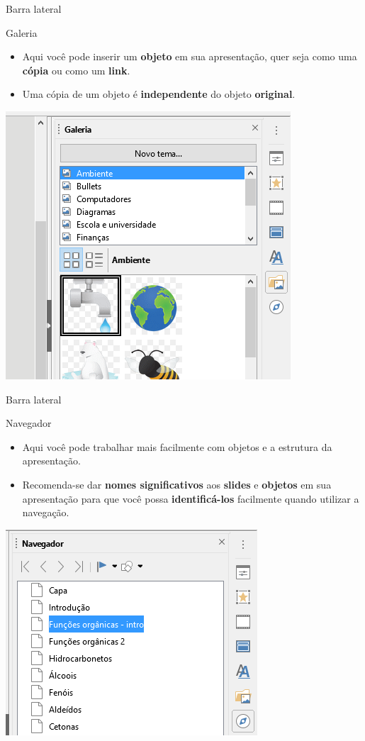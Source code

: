 \begin{frame}{Barra lateral}
	\begin{block}{Galeria}
		\begin{itemize}
			\item Aqui você pode inserir um \textbf{objeto} em sua apresentação, quer seja como uma \textbf{cópia} ou como um \textbf{link}.
			\item Uma cópia de um objeto é \textbf{independente} do objeto \textbf{original}.
		\end{itemize}
	\end{block}

	\centering
	\includegraphics[width=0.45\linewidth]{Figuras/Ch05/fig14}
\end{frame}


\begin{frame}{Barra lateral}
	\begin{block}{Navegador}
		\begin{itemize}
			\item Aqui você pode trabalhar mais facilmente com objetos e a estrutura da apresentação.
			\item Recomenda-se dar \textbf{nomes significativos} aos \textbf{slides} e \textbf{objetos} em sua apresentação para que você possa \textbf{identificá-los} facilmente quando utilizar a navegação.
		\end{itemize}
	\end{block}

	\centering
	\includegraphics[width=0.4\linewidth]{Figuras/Ch05/fig15}
\end{frame}


